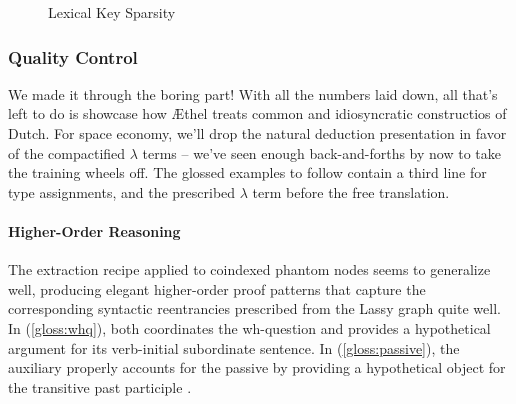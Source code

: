 \begin{figure}
	\centering
	\caption{Lexical Key Sparsity}
	\label{figure:entry_sparsity}
\end{figure}

\pagebreak

\subsubsection{Quality Control}
We made it through the boring part!
With all the numbers laid down, all that's left to do is showcase how \AE thel treats common and idiosyncratic constructios of Dutch.
For space economy, we'll drop the natural deduction presentation in favor of the compactified $\lambda$ terms -- we've seen enough back-and-forths by now to take the training wheels off.
The glossed examples to follow contain a third line for type assignments, and the prescribed $\lambda$ term before the free translation.

\paragraph{Higher-Order Reasoning}
The extraction recipe applied to coindexed phantom nodes seems to generalize well, producing elegant higher-order proof patterns that capture the corresponding syntactic reentrancies prescribed from the Lassy graph quite well.
In (\ref{gloss:whq}),  both coordinates the wh-question and provides a hypothetical argument for its verb-initial subordinate sentence.
In (\ref{gloss:passive}), the auxiliary  properly accounts for the passive by providing a hypothetical object for the transitive past participle .

